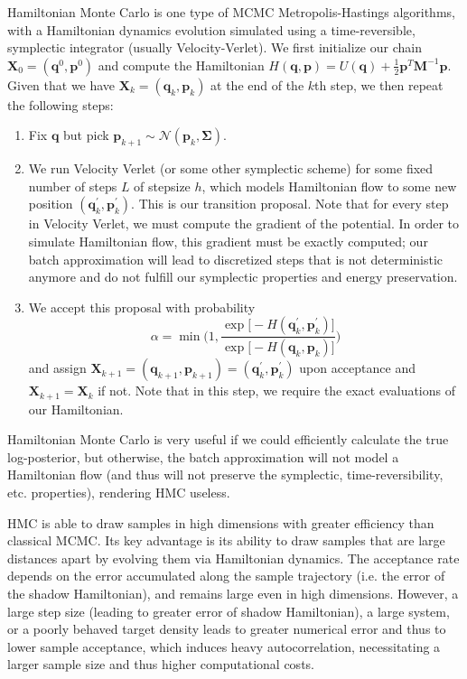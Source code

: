     Hamiltonian Monte Carlo is one type of MCMC Metropolis-Hastings algorithms, with a Hamiltonian dynamics evolution simulated using a time-reversible, symplectic integrator (usually Velocity-Verlet). We first initialize our chain $\mathbf{X}_0 = (\mathbf{q}^0, \mathbf{p}^0)$ and compute the Hamiltonian $H(\mathbf{q}, \mathbf{p}) = U(\mathbf{q}) + \frac{1}{2} \mathbf{p}^T \mathbf{M}^{-1} \mathbf{p}$. Given that we have $\mathbf{X}_k = (\mathbf{q}_k, \mathbf{p}_k)$ at the end of the $k$th step, we then repeat the following steps: 
    \begin{enumerate}
        \item Fix $\mathbf{q}$ but pick $\mathbf{p}_{k+1} \sim \mathcal{N}(\mathbf{p}_k, \mathbf{\Sigma})$. 
        \item We run Velocity Verlet (or some other symplectic scheme) for some fixed number of steps $L$ of stepsize $h$, which models Hamiltonian flow to some new position $(\mathbf{q}_k^\prime, \mathbf{p}_k^\prime)$. This is our transition proposal. Note that for every step in Velocity Verlet, we must compute the gradient of the potential. In order to simulate Hamiltonian flow, this gradient must be exactly computed; our batch approximation will lead to discretized steps that is not deterministic anymore and do not fulfill our symplectic properties and energy preservation. 
        \item We accept this proposal with probability 
        \begin{equation}
          \alpha = \min \bigg( 1, \frac{\exp \big[ -H(\mathbf{q}_k^\prime, \mathbf{p}_k^\prime) \big]}{\exp \big[ -H(\mathbf{q}_k, \mathbf{p}_k)\big]} \bigg)
        \end{equation}
        and assign $\mathbf{X}_{k+1} = (\mathbf{q}_{k+1}, \mathbf{p}_{k+1}) = (\mathbf{q}_k^\prime, \mathbf{p}_k^\prime)$ upon acceptance and $\mathbf{X}_{k+1} = \mathbf{X}_k$ if not. Note that in this step, we require the exact evaluations of our Hamiltonian. 
    \end{enumerate}
    Hamiltonian Monte Carlo is very useful if we could efficiently calculate the true log-posterior, but otherwise, the batch approximation will not model a Hamiltonian flow (and thus will not preserve the symplectic, time-reversibility, etc. properties), rendering HMC useless. 

    HMC is able to draw samples in high dimensions with greater efficiency than classical MCMC. Its key advantage is its ability to draw samples that are large distances apart by evolving them via Hamiltonian dynamics. The acceptance rate depends on the error accumulated along the sample trajectory (i.e. the error of the shadow Hamiltonian), and remains large even in high dimensions. However, a large step size (leading to greater error of shadow Hamiltonian), a large system, or a poorly behaved target density leads to greater numerical error and thus to lower sample acceptance, which induces heavy autocorrelation, necessitating a larger sample size and thus higher computational costs. 

